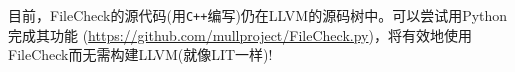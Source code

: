 目前，FileCheck的源代码(用\texttt{C++}编写)仍在LLVM的源码树中。可以尝试用Python完成其功能 (\url{https://github.com/mullproject/FileCheck.py})，将有效地使用FileCheck而无需构建LLVM(就像LIT一样)!